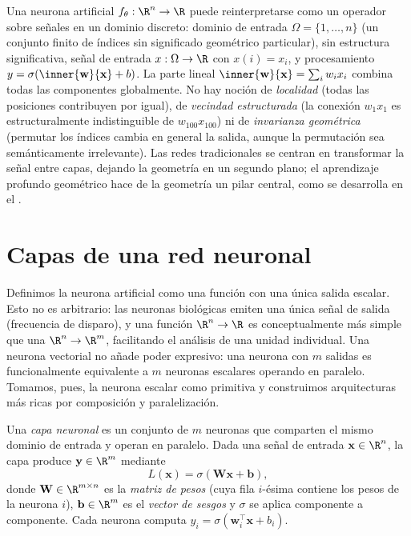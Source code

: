 Una neurona artificial $f_\theta : \R^n \to \R$ puede reinterpretarse como un
operador sobre se\~nales en un dominio discreto: dominio de entrada $\Omega =
\{1, \ldots, n\}$ (un conjunto finito de \'indices sin significado geom\'etrico
particular), sin estructura significativa, se\~nal de entrada $x : \Omega \to \R$
con $x(i) = x_i$, y procesamiento $y = \sigma(\inner{\mathbf{w}}{\mathbf{x}} + b)$.
La parte lineal $\inner{\mathbf{w}}{\mathbf{x}} = \sum_i w_i x_i$ combina todas las
componentes globalmente. No hay noci\'on de \emph{localidad} (todas las posiciones
contribuyen por igual), de \emph{vecindad estructurada} (la conexi\'on $w_1 x_1$
es estructuralmente indistinguible de $w_{100} x_{100}$) ni de \emph{invarianza
geom\'etrica} (permutar los \'indices cambia en general la salida, aunque la
permutaci\'on sea sem\'anticamente irrelevante). Las redes tradicionales se centran
en transformar la se\~nal entre capas, dejando la geometr\'ia en un segundo plano;
el aprendizaje profundo geom\'etrico hace de la geometr\'ia un pilar central, como
se desarrolla en el .

\section{Capas de una red neuronal}
\label{sec:found:layers}

Definimos la neurona artificial como una funci\'on con una \'unica salida escalar.
Esto no es arbitrario: las neuronas biol\'ogicas emiten una \'unica se\~nal de
salida (frecuencia de disparo), y una funci\'on $\R^n \to \R$ es conceptualmente
m\'as simple que una $\R^n \to \R^m$, facilitando el an\'alisis de una unidad
individual. Una neurona vectorial no a\~nade poder expresivo: una neurona con $m$
salidas es funcionalmente equivalente a $m$ neuronas escalares operando en
paralelo. Tomamos, pues, la neurona escalar como primitiva y construimos
arquitecturas m\'as ricas por composici\'on y paralelizaci\'on.

\begin{definition}
\label{def:found:layer}
Una \emph{capa neuronal} es un conjunto de $m$ neuronas que comparten el mismo
dominio de entrada y operan en paralelo. Dada una se\~nal de entrada $\mathbf{x}
\in \R^n$, la capa produce $\mathbf{y} \in \R^m$ mediante
\[
  L(\mathbf{x}) = \sigma(\mathbf{W}\mathbf{x} + \mathbf{b}),
\]
donde $\mathbf{W} \in \R^{m \times n}$ es la \emph{matriz de pesos} (cuya fila
$i$-\'esima contiene los pesos de la neurona $i$), $\mathbf{b} \in \R^m$ es el
\emph{vector de sesgos} y $\sigma$ se aplica componente a componente. Cada neurona
computa $y_i = \sigma(\mathbf{w}_i^\top \mathbf{x} + b_i)$.
\end{definition}

